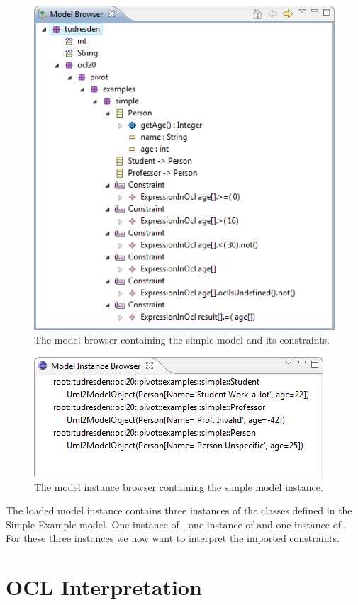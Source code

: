 \begin{figure}[!htbp]
	\centering
	\includegraphics[width=0.8\linewidth]{figures/interpreter/prepare01}
	\caption{The model browser containing the simple model and its constraints.}
	\label{pic:interpret:prepare01}
\end{figure}

\begin{figure}[!htbp]
	\centering
	\includegraphics[width=0.7\linewidth]{figures/interpreter/prepare02}
	\caption{The model instance browser containing the simple model instance.}
	\label{pic:interpret:prepare02}
\end{figure}

The loaded model instance contains three instances of the classes defined in the Simple Example model. One instance of , one instance of  and one instance of . For these three instances we now want to interpret the imported constraints.



\section{OCL Interpretation}

